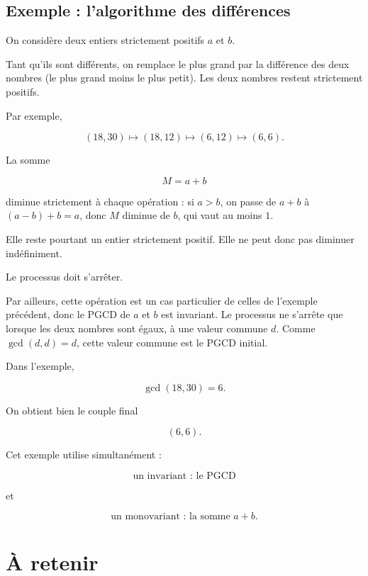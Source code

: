 \subsection{Exemple : l'algorithme des différences}

On considère deux entiers strictement positifs \(a\) et \(b\).

Tant qu'ils sont différents, on remplace le plus grand par la différence des
deux nombres (le plus grand moins le plus petit). Les deux nombres restent
strictement positifs.

Par exemple,

\[
(18,30)
\longmapsto
(18,12)
\longmapsto
(6,12)
\longmapsto
(6,6).
\]

La somme

\[
M=a+b
\]

diminue strictement à chaque opération : si \(a>b\), on passe de \(a+b\) à
\((a-b)+b=a\), donc \(M\) diminue de \(b\), qui vaut au moins \(1\).

Elle reste pourtant un entier strictement positif. Elle ne peut donc pas
diminuer indéfiniment.

Le processus doit s'arrêter.

Par ailleurs, cette opération est un cas particulier de celles de l'exemple
précédent, donc le PGCD de \(a\) et \(b\) est invariant. Le processus ne
s'arrête que lorsque les deux nombres sont égaux, à une valeur commune \(d\).
Comme \(\gcd(d,d)=d\), cette valeur commune est le PGCD initial.

Dans l'exemple,

\[
\gcd(18,30)=6.
\]

On obtient bien le couple final

\[
(6,6).
\]

Cet exemple utilise simultanément :

\[
\boxed{\text{un invariant : le PGCD}}
\]

et

\[
\boxed{\text{un monovariant : la somme \(a+b\)}}.
\]

\section{À retenir}

